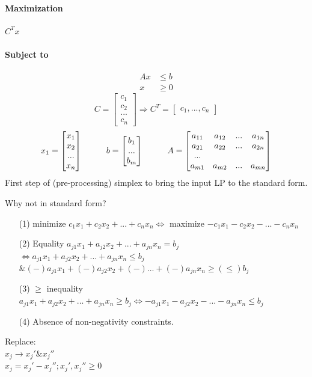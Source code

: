\paragraph{Maximization} $C^Tx$
\paragraph{Subject to} \begin{align*}
	Ax &\leq b \\
	x & \geq 0
\end{align*}
$$C = \begin{bmatrix}
c_1 \\ c_2 \\ ... \\ c_n
\end{bmatrix} \Rightarrow C^T = \begin{bmatrix}
c_1,...,c_n
\end{bmatrix}$$
$$x_1 = \begin{bmatrix}
x_1 \\ x_2 \\ ... \\ x_n
\end{bmatrix} \hspace*{1cm} b = \begin{bmatrix}
b_1 \\ ... \\ b_m
\end{bmatrix} \hspace{1cm} A = \begin{bmatrix}
a_{11} & a_{12} & ... & a_{1n} \\
a_{21} & a_{22} & ... & a_{2n} \\
... \\
a_{m1} & a_{m2} & ... & a_{mn} 
\end{bmatrix}$$
First step of (pre-processing) simplex to bring the input LP to the standard form.

Why not in standard form?
\begin{itemize}
\item[(1)] minimize $c_1x_1+c_2x_2+...+c_nx_n \Leftrightarrow$ maximize $-c_1x_1-c_2x_2-...-c_nx_n$
\item[(2)] Equality $a_{j1}x_1 + a_{j2}x_2 + ... + a_{jn}x_n = b_j$ \\ $\Leftrightarrow a_{j1}x_1 + a_{j2}x_2 + ... + a_{jn}x_n \leq b_j$ \\
$\& (-) a_{j1}x_1 +(-) a_{j2}x_2 +(-) ... +(-) a_{jn}x_n \geq (\leq) b_j$
\item[(3)] $\geq$ inequality $a_{j1}x_1 + a_{j2}x_2 + ... + a_{jn}x_n \geq b_j \Leftrightarrow -a_{j1}x_1 - a_{j2}x_2 - ... - a_{jn}x_n \leq b_j$
\item[(4)] Absence of non-negativity constraints.
\end{itemize}
Replace: \\ 
$x_j \rightarrow x_j' \& x_j''$ \\
$x_j = x_j'-x_j'';x_j',x_j'' \geq 0$
